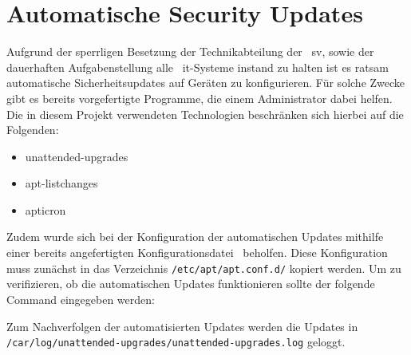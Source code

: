 
\section{Automatische Security Updates}\label{sec:automatische-security-updates}
Aufgrund der sperrligen Besetzung der Technikabteilung der ~\gls{sv}, sowie der dauerhaften Aufgabenstellung alle ~\gls{it}-Systeme instand zu halten ist es ratsam automatische
Sicherheitsupdates auf Geräten zu konfigurieren.
Für solche Zwecke gibt es bereits vorgefertigte Programme, die einem Administrator dabei helfen. \\
Die in diesem Projekt verwendeten Technologien beschränken sich hierbei auf die Folgenden:
\begin{itemize}
    \item unattended-upgrades
    \item apt-listchanges
    \item apticron
\end{itemize}

\linebreak
Zudem wurde sich bei der Konfiguration der automatischen Updates mithilfe einer bereits angefertigten Konfigurationsdatei~\cite{auto-update-config} beholfen.
Diese Konfiguration muss zunächst in das Verzeichnis \texttt{/etc/apt/apt.conf.d/} kopiert werden.
Um zu verifizieren, ob die automatischen Updates funktionieren sollte der folgende Command eingegeben werden:

\linebreak
Zum Nachverfolgen der automatisierten Updates werden die Updates in \texttt{/car/log/unattended-upgrades/unattended-upgrades.log} geloggt.